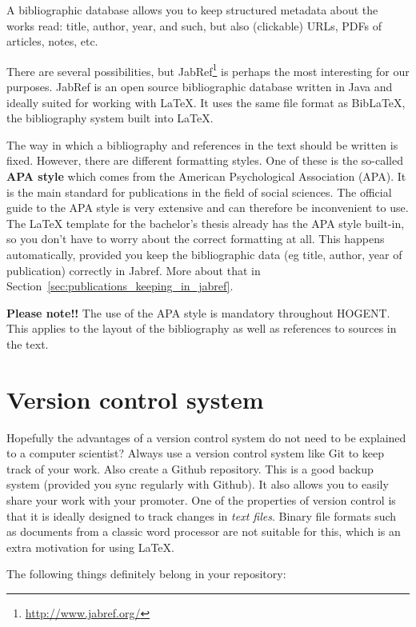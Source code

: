 A bibliographic database allows you to keep structured metadata about the works read: title, author, year, and such, but also (clickable) URLs, PDFs of articles, notes, etc.

There are several possibilities, but JabRef\footnote{\url{http://www.jabref.org/}} is perhaps the most interesting for our purposes. JabRef is an open source bibliographic database written in Java and ideally suited for working with {\LaTeX}. It uses the same file format as Bib{\LaTeX}, the bibliography system built into {\LaTeX}.

The way in which a bibliography and references in the text should be written is fixed. However, there are different formatting styles. One of these is the so-called \textbf{APA style} which comes from the American Psychological Association (APA). It is the main standard for publications in the field of social sciences. The official guide to the APA style is very extensive and can therefore be inconvenient to use. The {\LaTeX} template for the bachelor's thesis already has the APA style built-in, so you don't have to worry about the correct formatting at all. This happens automatically, provided you keep the bibliographic data (eg title, author, year of publication) correctly in Jabref. More about that in Section~\ref{sec:publications_keeping_in_jabref}.

\textbf{Please note!!} The use of the APA style is mandatory throughout HOGENT. This applies to the layout of the bibliography as well as references to sources in the text.

\section{Version control system}
\label{sec:versioncontrolsystem}

Hopefully the advantages of a version control system do not need to be explained to a computer scientist? Always use a version control system like Git to keep track of your work. Also create a Github repository. This is a good backup system (provided you sync regularly with Github). It also allows you to easily share your work with your promoter. One of the properties of version control is that it is ideally designed to track changes in \emph{text files}. Binary file formats such as documents from a classic word processor are not suitable for this, which is an extra motivation for using \LaTeX{}.

The following things definitely belong in your repository:

